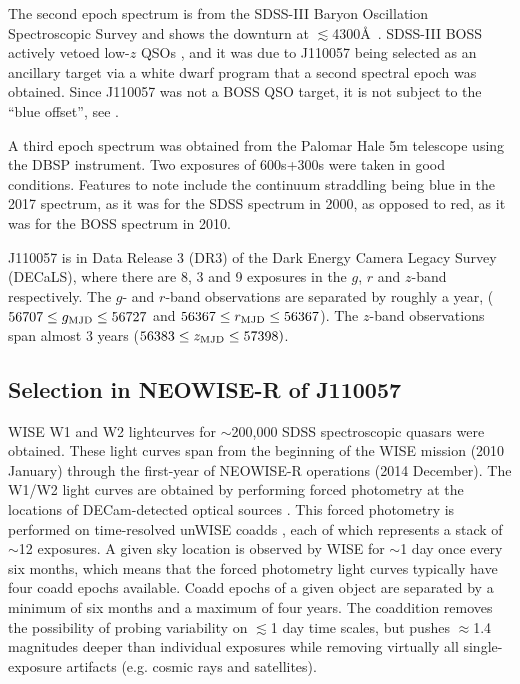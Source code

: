\documentclass[11pt,a4paper]{article}
\begin{document}
The second epoch spectrum is from the SDSS-III Baryon Oscillation
Spectroscopic Survey \citep[BOSS; ][]{Dawson2013} and shows the
downturn at $\lesssim$4300\AA\ .  SDSS-III BOSS actively vetoed
low-$z$ QSOs \citep{Ross2012}, and it was due to J110057 being
selected as an ancillary target via a white dwarf program
\citep{Kepler2015, Kepler2016} that a second spectral epoch was
obtained.  Since J110057 was not a BOSS QSO target, it is not subject
to the ``blue offset'', see \citet{Margala2016}.

A third epoch spectrum was obtained from the Palomar Hale 5m telescope
using the DBSP instrument.  Two exposures of 600s+300s were taken in
good conditions. Features to note include the continuum straddling
\mgii being blue in the 2017 spectrum, as it was for the SDSS spectrum
in 2000, as opposed to red, as it was for the BOSS spectrum in 2010.

J110057 is in Data Release 3 (DR3) of the Dark Energy 
Camera Legacy Survey (DECaLS), where there are 8, 3 and 9 exposures in
the $g$, $r$ and $z$-band respectively. The $g$- and $r$-band
observations are separated by roughly a year, ($56707 \leq g_{\rm MJD}
\leq 56727$ and $56367 \leq r_{\rm MJD} \leq 56367$). The $z$-band
observations span almost 3 years ($56383 \leq z_{\rm MJD} \leq
57398)$.


\subsection*{Selection in NEOWISE-R of J110057}

WISE W1 and W2 lightcurves for $\sim$200,000 SDSS spectroscopic
quasars were obtained. These light curves span from the beginning of
the WISE mission (2010 January) through the first-year of NEOWISE-R
operations (2014 December). The W1/W2 light curves are obtained by
performing forced photometry at the locations of DECam-detected
optical sources \citep{Lang2014, Meisner2017a, Meisner2017b}.  This
forced photometry is performed on time-resolved unWISE coadds
\citep{Lang2014}, each of which represents a stack of $\sim$12
exposures. A given sky location is observed by WISE for $\sim$1 day
once every six months, which means that the forced photometry light
curves typically have four coadd epochs available. Coadd epochs of a
given object are separated by a minimum of six months and a maximum of
four years. The coaddition removes the possibility of probing
variability on $\lesssim$1 day time scales, but pushes $\approx$1.4
magnitudes deeper than individual exposures while removing virtually
all single-exposure artifacts (e.g. cosmic rays and satellites).
\end{document}
